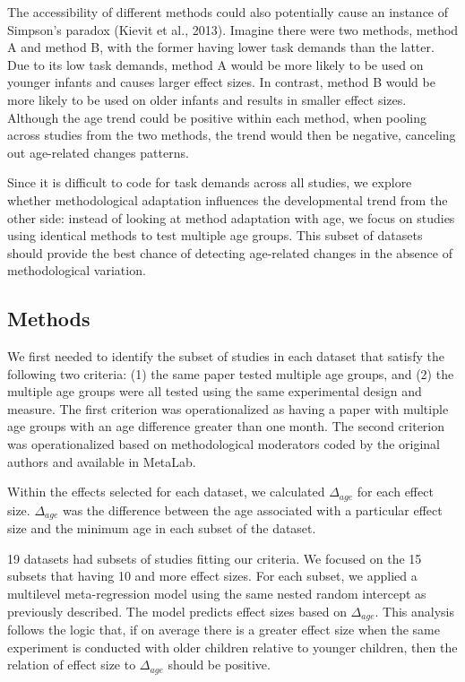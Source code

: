 \documentclass[
  man]{apa6}
\begin{document}
The accessibility of different methods could also potentially cause an instance of Simpson's paradox (Kievit et al., 2013). Imagine there were two methods, method A and method B, with the former having lower task demands than the latter. Due to its low task demands, method A would be more likely to be used on younger infants and causes larger effect sizes. In contrast, method B would be more likely to be used on older infants and results in smaller effect sizes. Although the age trend could be positive within each method, when pooling across studies from the two methods, the trend would then be negative, canceling out age-related changes patterns.

Since it is difficult to code for task demands across all studies, we explore whether methodological adaptation influences the developmental trend from the other side: instead of looking at method adaptation with age, we focus on studies using identical methods to test multiple age groups. This subset of datasets should provide the best chance of detecting age-related changes in the absence of methodological variation.

\hypertarget{methods-2}{%
\subsection{Methods}\label{methods-2}}

We first needed to identify the subset of studies in each dataset that satisfy the following two criteria: (1) the same paper tested multiple age groups, and (2) the multiple age groups were all tested using the same experimental design and measure. The first criterion was operationalized as having a paper with multiple age groups with an age difference greater than one month. The second criterion was operationalized based on methodological moderators coded by the original authors and available in MetaLab.

Within the effects selected for each dataset, we calculated \(\Delta_{age}\) for each effect size. \(\Delta_{age}\) was the difference between the age associated with a particular effect size and the minimum age in each subset of the dataset.

19 datasets had subsets of studies fitting our criteria. We focused on the 15 subsets that having 10 and more effect sizes. For each subset, we applied a multilevel meta-regression model using the same nested random intercept as previously described. The model predicts effect sizes based on \(\Delta_{age}\). This analysis follows the logic that, if on average there is a greater effect size when the same experiment is conducted with older children relative to younger children, then the relation of effect size to \(\Delta_{age}\) should be positive.
\end{document}
